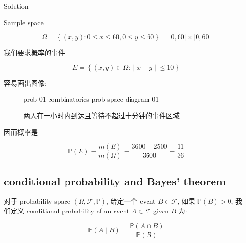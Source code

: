 \begin{qlsolution}{Solution}

Sample space

\[\Omega = \left\{ {(\mathit{x},\mathit{y}):0 \leq \mathit{x} \leq 60,0 \leq \mathit{y} \leq 60} \right\} = \lbrack 0,60\rbrack \times \lbrack 0,60\rbrack\]

我们要求概率的事件

\[\mathit{E} = \left\{ (\mathit{x},\mathit{y}) \in \Omega: \middle| \mathit{x} - \mathit{y} \middle| \leq 10 \right\}\]

容易画出图像:

\begin{figure}[htbp]
\centering
\begin{qldrawing}
\csname prob-01-combinatorics-prob-space-diagram-01\endcsname
\end{qldrawing}

\caption{两人在一小时内到达且等待不超过十分钟的事件区域}

\label{fig-prob-01-combinatorics-prob-space-diagram-01}

\end{figure}

因而概率是

\[\mathbb{P}(\mathit{E}) = \frac{\mathit{m}(\mathit{E})}{\mathit{m}(\Omega)} = \frac{3600 - 2500}{3600} = \frac{11}{36}\]

\end{qlsolution}

\subsection{conditional probability and Bayes' theorem}\label{conditional-probability-and-bayes-theorem}

\begin{definition}{}

对于 probability space \((\Omega,\mathcal{F},\mathbb{P})\), 给定一个 event \(\mathit{B} \in \mathcal{F}\), 如果 \(\mathbb{P}(\mathit{B}) > 0\), 我们定义 conditional probability of an event \(\mathit{A} \in \mathcal{F}\) given \(\mathit{B}\) 为:

\[\mathbb{P}(\mathit{A} \mid \mathit{B}) = \frac{\mathbb{P}(\mathit{A} \cap \mathit{B})}{\mathbb{P}(\mathit{B})}\]

\end{definition}

